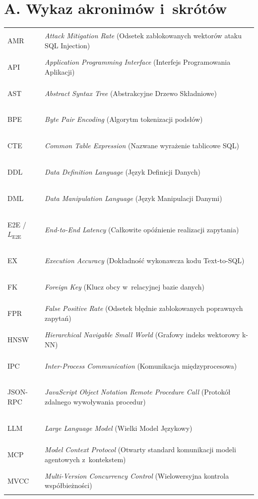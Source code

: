
\section*{A. Wykaz akronimów i~skrótów}

\begin{longtable}[l]{>{\bfseries\raggedright\arraybackslash}p{2.8cm} >{\raggedright\arraybackslash}p{12.0cm}}
AMR & \emph{Attack Mitigation Rate} (Odsetek zablokowanych wektorów ataku SQL Injection) \\[1.5pt]
API & \emph{Application Programming Interface} (Interfejs Programowania Aplikacji) \\[1.5pt]
AST & \emph{Abstract Syntax Tree} (Abstrakcyjne Drzewo Składniowe) \\[1.5pt]
BPE & \emph{Byte Pair Encoding} (Algorytm tokenizacji podsłów) \\[1.5pt]
CTE & \emph{Common Table Expression} (Nazwane wyrażenie tablicowe SQL) \\[1.5pt]
DDL & \emph{Data Definition Language} (Język Definicji Danych) \\[1.5pt]
DML & \emph{Data Manipulation Language} (Język Manipulacji Danymi) \\[1.5pt]
E2E / $L_{\text{E2E}}$ & \emph{End-to-End Latency} (Całkowite opóźnienie realizacji zapytania) \\[1.5pt]
EX & \emph{Execution Accuracy} (Dokładność wykonawcza kodu Text-to-SQL) \\[1.5pt]
FK & \emph{Foreign Key} (Klucz obcy w~relacyjnej bazie danych) \\[1.5pt]
FPR & \emph{False Positive Rate} (Odsetek błędnie zablokowanych poprawnych zapytań) \\[1.5pt]
HNSW & \emph{Hierarchical Navigable Small World} (Grafowy indeks wektorowy k-NN) \\[1.5pt]
IPC & \emph{Inter-Process Communication} (Komunikacja międzyprocesowa) \\[1.5pt]
JSON-RPC & \emph{JavaScript Object Notation Remote Procedure Call} (Protokół zdalnego wywoływania procedur) \\[1.5pt]
LLM & \emph{Large Language Model} (Wielki Model Językowy) \\[1.5pt]
MCP & \emph{Model Context Protocol} (Otwarty standard komunikacji modeli agentowych z~kontekstem) \\[1.5pt]
MVCC & \emph{Multi-Version Concurrency Control} (Wielowersyjna kontrola współbieżności) \\[1.5pt]

\end{longtable}
